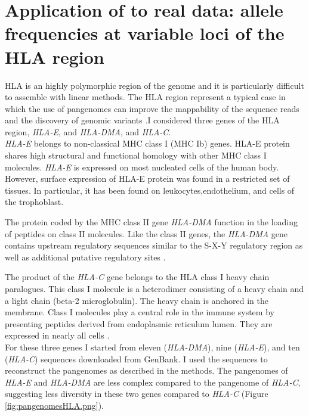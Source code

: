 \newpage
\section{Application of \vgp to real data: allele frequencies at variable loci of the HLA region}

HLA is an highly polymorphic region of the genome and it is particularly difficult to assemble with linear methods. The HLA region represent a typical case in which the use of pangenomes can improve the mappability of the sequence reads and the discovery of genomic variants \cite{chin2019diploid}.I considered three genes of the HLA region, \textit{HLA-E}, and \textit{HLA-DMA}, and \textit{HLA-C}.\\

\textit{HLA-E} belongs to non-classical MHC class I (MHC Ib) genes. HLA-E protein shares high structural and functional homology with other MHC class I molecules. \textit{HLA-E} is expressed on most nucleated cells of the human body. However, surface expression of HLA-E protein was found in a restricted set of tissues. In particular, it has been found on leukocytes,endothelium, and cells of the trophoblast\cite{kanevskiy2019dimorphism}.

The protein coded by the MHC class II gene \textit{HLA-DMA} function in the loading of peptides on class II molecules. Like the class II genes, the \textit{HLA-DMA} gene contains upstream regulatory sequences similar to the S-X-Y regulatory region as well as additional putative regulatory sites \cite{westerheide1997hla}.

The product of the \textit{HLA-C} gene belongs to the HLA class I heavy chain paralogues. This class I molecule is a heterodimer consisting of a heavy chain and a light chain (beta-2 microglobulin). The heavy chain is anchored in the membrane. Class I molecules play a central role in the immune system by presenting peptides derived from endoplasmic reticulum lumen. They are expressed in nearly all cells \cite{HLA-C}.\\

For these three genes I started from eleven (\textit{HLA-DMA}), nine (\textit{HLA-E}), and ten (\textit{HLA-C}) sequences downloaded from GenBank. I used the sequences to reconstruct the pangenomes as described in the methods. The pangenomes of \textit{HLA-E} and \textit{HLA-DMA} are less complex compared to the pangenome of \textit{HLA-C}, suggesting less diversity in these two genes compared to \textit{HLA-C} (Figure \ref{fig:pangenomesHLA.png}).\\ 

